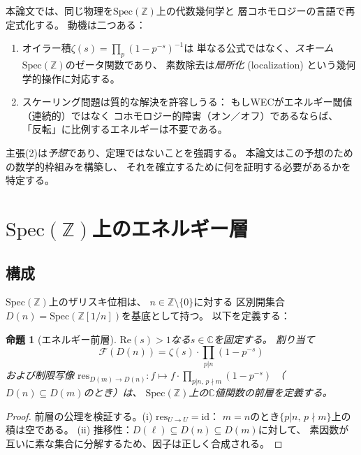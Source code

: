 \documentclass[11pt,a4paper]{article}
\newtheorem{proposition}[theorem]{命題}
\newcommand{\Spec}{\mathrm{Spec}}
\begin{document}
本論文では、同じ物理を$\Spec(\mathbb{Z})$上の代数幾何学と
層コホモロジーの言語で再定式化する。
動機は二つある：
\begin{enumerate}
  \item オイラー積$\zeta(s) = \prod_p (1-p^{-s})^{-1}$は
    単なる公式ではなく、\emph{スキーム}$\Spec(\mathbb{Z})$のゼータ関数であり、
    素数除去は\emph{局所化} (localization) という幾何学的操作に対応する。
  \item スケーリング問題は質的な解決を許容しうる：
    もしWECがエネルギー閾値（連続的）ではなく
    コホモロジー的障害（オン／オフ）であるならば、
    「反転」に比例するエネルギーは不要である。
\end{enumerate}

主張(2)は\emph{予想}であり、定理ではないことを強調する。
本論文はこの予想のための数学的枠組みを構築し、
それを確立するために何を証明する必要があるかを特定する。

\section{$\Spec(\mathbb{Z})$上のエネルギー層}
\label{sec:sheaf}

\subsection{構成}

$\Spec(\mathbb{Z})$上のザリスキ位相は、
$n \in \mathbb{Z} \setminus \{0\}$に対する
区別開集合$D(n) = \Spec(\mathbb{Z}[1/n])$を基底として持つ。
以下を定義する：

\begin{proposition}[エネルギー前層]
\label{prop:presheaf}
$\mathrm{Re}(s) > 1$なる$s \in \mathbb{C}$を固定する。
割り当て
\begin{equation}
  \mathcal{F}(D(n)) = \zeta(s) \cdot \prod_{p | n} (1 - p^{-s})
  \label{eq:energy_sheaf}
\end{equation}
および制限写像
$\mathrm{res}_{D(m) \to D(n)}: f \mapsto f \cdot \prod_{p|n,\, p \nmid m} (1-p^{-s})$
（$D(n) \subseteq D(m)$のとき）は、
$\Spec(\mathbb{Z})$上の$\mathbb{C}$値関数の前層を定義する。
\end{proposition}

\begin{proof}
前層の公理を検証する。(i) $\mathrm{res}_{U \to U} = \mathrm{id}$：
$m = n$のとき$\{p | n,\, p \nmid m\}$上の積は空である。
(ii) 推移性：$D(\ell) \subseteq D(n) \subseteq D(m)$に対して、
素因数が互いに素な集合に分解するため、因子は正しく合成される。
\end{proof}
\end{document}
